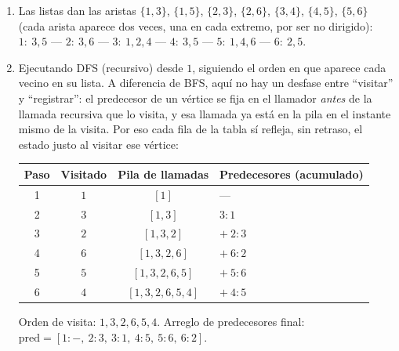 \begin{enumerate}
  \item Las listas dan las aristas $\{1,3\}$, $\{1,5\}$, $\{2,3\}$, $\{2,6\}$, $\{3,4\}$, $\{4,5\}$, $\{5,6\}$ (cada arista aparece dos veces, una en cada extremo, por ser no dirigido): $1{:}\ 3,5$ --- $2{:}\ 3,6$ --- $3{:}\ 1,2,4$ --- $4{:}\ 3,5$ --- $5{:}\ 1,4,6$ --- $6{:}\ 2,5$.

  \item Ejecutando DFS (recursivo) desde $1$, siguiendo el orden en que aparece cada vecino en su lista. A diferencia de BFS, aquí no hay un desfase entre ``visitar'' y ``registrar'': el predecesor de un vértice se fija en el llamador \emph{antes} de la llamada recursiva que lo visita, y esa llamada ya está en la pila en el instante mismo de la visita. Por eso cada fila de la tabla sí refleja, sin retraso, el estado justo al visitar ese vértice:

\begin{center}
\begin{tabular}{|c|c|c|l|}
\hline
\textbf{Paso} & \textbf{Visitado} & \textbf{Pila de llamadas} & \textbf{Predecesores (acumulado)} \\
\hline
1 & $1$ & $[1]$ & --- \\
2 & $3$ & $[1,3]$ & $3{:}1$ \\
3 & $2$ & $[1,3,2]$ & $+\ 2{:}3$ \\
4 & $6$ & $[1,3,2,6]$ & $+\ 6{:}2$ \\
5 & $5$ & $[1,3,2,6,5]$ & $+\ 5{:}6$ \\
6 & $4$ & $[1,3,2,6,5,4]$ & $+\ 4{:}5$ \\
\hline
\end{tabular}
\end{center}

  Orden de visita: $1,3,2,6,5,4$. Arreglo de predecesores final: $\text{pred} = [1{:}-,\ 2{:}3,\ 3{:}1,\ 4{:}5,\ 5{:}6,\ 6{:}2]$.
\end{enumerate}
